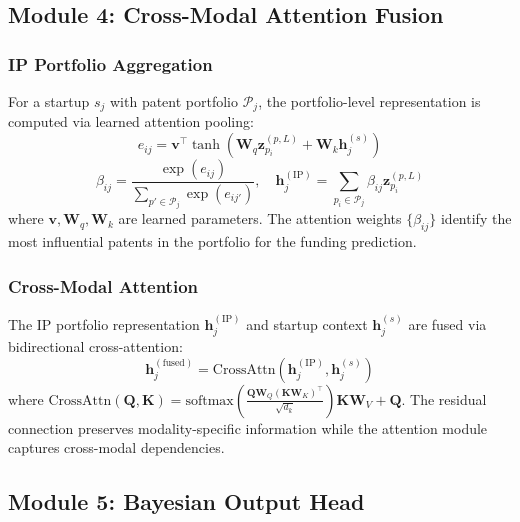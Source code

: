 \documentclass[journal]{IEEEtran}
\begin{document}
\subsection{Module 4: Cross-Modal Attention Fusion}

\subsubsection{IP Portfolio Aggregation}

For a startup $s_j$ with patent portfolio $\mathcal{P}_j$, the portfolio-level representation is computed via learned attention pooling:
\begin{equation}
    e_{ij} = \mathbf{v}^\top \tanh(\mathbf{W}_q \mathbf{z}_{p_i}^{(p,L)} + \mathbf{W}_k \mathbf{h}_j^{(s)})
    \label{eq:pool_attn}
\end{equation}
\begin{equation}
    \beta_{ij} = \frac{\exp(e_{ij})}{\sum_{p' \in \mathcal{P}_j} \exp(e_{ij'})}, \quad
    \mathbf{h}_j^{(\text{IP})} = \sum_{p_i \in \mathcal{P}_j} \beta_{ij} \mathbf{z}_{p_i}^{(p,L)}
    \label{eq:portfolio}
\end{equation}
where $\mathbf{v}, \mathbf{W}_q, \mathbf{W}_k$ are learned parameters. The attention weights $\{\beta_{ij}\}$ identify the most influential patents in the portfolio for the funding prediction.

\subsubsection{Cross-Modal Attention}

The IP portfolio representation $\mathbf{h}_j^{(\text{IP})}$ and startup context $\mathbf{h}_j^{(s)}$ are fused via bidirectional cross-attention:
\begin{equation}
    \mathbf{h}_j^{(\text{fused})} = \text{CrossAttn}\!\left(\mathbf{h}_j^{(\text{IP})}, \mathbf{h}_j^{(s)}\right)
    \label{eq:crossattn}
\end{equation}
where $\text{CrossAttn}(\mathbf{Q}, \mathbf{K}) = \text{softmax}\!\left(\frac{\mathbf{Q}\mathbf{W}_Q (\mathbf{K}\mathbf{W}_K)^\top}{\sqrt{d_k}}\right)\mathbf{K}\mathbf{W}_V + \mathbf{Q}$. The residual connection preserves modality-specific information while the attention module captures cross-modal dependencies.

\subsection{Module 5: Bayesian Output Head}
\end{document}
